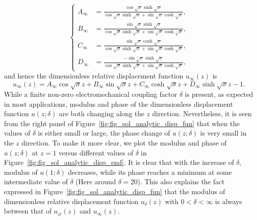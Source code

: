 \documentclass{svjour3}                     %
\begin{document}
\begin{equation}
    \left\{\begin{aligned}
        A_\infty &= \frac{ \cos\sqrt{\sigma } \sinh\sqrt{\sigma } }{ \cos\sqrt{\sigma } \sinh\sqrt{\sigma } + \sin\sqrt{\sigma } \cosh\sqrt{\sigma } }, \\
        B_\infty &= \frac{ \sin\sqrt{\sigma } \sinh\sqrt{\sigma } }{ \cos\sqrt{\sigma } \sinh\sqrt{\sigma } + \sin\sqrt{\sigma } \cosh\sqrt{\sigma } }, \\
        C_\infty &= \frac{ \sin\sqrt{\sigma } \cosh\sqrt{\sigma } }{ \cos\sqrt{\sigma } \sinh\sqrt{\sigma } + \sin\sqrt{\sigma } \cosh\sqrt{\sigma } }, \\
        D_\infty &= \frac{ - \sin\sqrt{\sigma } \sinh\sqrt{\sigma } }{ \cos\sqrt{\sigma } \sinh\sqrt{\sigma } + \sin\sqrt{\sigma } \cosh\sqrt{\sigma } },
    \end{aligned}\right.
    \label{eq:eq_disp_func_coeffs_exps_infty}
\end{equation}
and hence the dimensionless relative displacement function $u_{\infty} (z)$ is
\begin{equation}
    u_{\infty} (z) = A_{\infty} \cos{\sqrt{\sigma}z} + B_{\infty} \sin{\sqrt{\sigma}z} + C_{\infty} \cosh{\sqrt{\sigma}z} + D_{\infty} \sinh{\sqrt{\sigma}z} - 1.
\end{equation}
While a finite non-zero electromechanical coupling factor $\delta$ is present, as expected in most applications, modulus and phase of the dimensionless displacement function $u(z;\delta)$ are both changing along the $z$ direction. Nevertheless, it is seen from the right panel of Figure~\ref{fig:fig_sol_analytic_disp_fun} that when the values of $\delta$ is either small or large, the phase change of $u(z;\delta)$ is very small in the $z$ direction. To make it more clear, we plot the modulus and phase of $u(z;\delta)$ at $z=1$ versus different values of $\delta$ in Figure~\ref{fig:fig_sol_analytic_disp_end}. It is clear that with the increase of $\delta$, modulus of $u(1;\delta)$ decreases, while its phase reaches a minimum at some intermediate value of $\delta$ (Here around $\delta = 20$). This also explains the fact expressed in Figure~\ref{fig:fig_sol_analytic_disp_fun} that the modulus of dimensionless relative displacement function $u_\delta (z)$ with $0 < \delta < \infty$ is always between that of $u_\varnothing (z)$ and $u_\infty (z)$.
\end{document}
